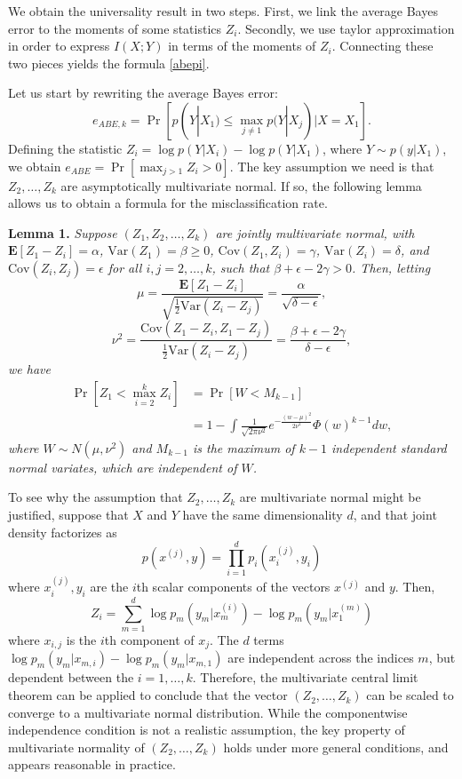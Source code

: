 \documentclass{article}
\newcommand{\E}{\textbf{E}}
\newcommand{\Cov}{\text{Cov}}
\newcommand{\Var}{\text{Var}}
\begin{document}
We obtain the universality result in two steps.  First, we link the
average Bayes error to the moments of some statistics $Z_i$.
Secondly, we use taylor approximation in order to express $I(X; Y)$ in
terms of the moments of $Z_i$.  Connecting these two pieces yields the
formula \eqref{abepi}.

Let us start by rewriting the average Bayes error:
\[
e_{ABE, k} = \Pr[p(Y|X_1) \leq \max_{j \neq 1} p(Y|X_j)| X = X_1].
\]
Defining the statistic $Z_i = \log p(Y|X_i) - \log p(Y|X_1)$, where $Y
\sim p(y|X_1)$, we obtain $ e_{ABE} = \Pr[\max_{j > 1} Z_i > 0].  $
The key assumption we need is that $Z_2,\hdots, Z_k$ are
asymptotically multivariate normal.  If so, the following lemma allows
us to obtain a formula for the misclassification rate.

\textbf{Lemma 1. }
\emph{
Suppose $(Z_1, Z_2, \hdots, Z_k)$ are jointly multivariate normal, with 
$\E[Z_1 - Z_i]= \alpha$, 
$\Var(Z_1) = \beta \geq 0$, 
$\Cov(Z_1, Z_i) = \gamma$, 
$\Var(Z_i)= \delta$, and $\Cov(Z_i, Z_j) = \epsilon$ for all $i, j = 2, \hdots,
k$, such that $\beta + \epsilon - 2\gamma > 0$.  Then, letting
\[
\mu = \frac{\E[Z_1 - Z_i]}{\sqrt{\frac{1}{2}\Var(Z_i - Z_j)}} = \frac{\alpha}{\sqrt{\delta - \epsilon}},
\]
\[
\nu^2 = \frac{\Cov(Z_1 -Z_i, Z_1 - Z_j)}{\frac{1}{2}\Var(Z_i - Z_j)} = \frac{\beta + \epsilon - 2\gamma}{\delta - \epsilon},
\]
we have
\begin{align*}
\Pr[Z_1 < \max_{i=2}^k Z_i] &= \Pr[W < M_{k-1}]
\\&= 1 - \int \frac{1}{\sqrt{2\pi\nu^2}} e^{-\frac{(w-\mu)^2}{2\nu^2}} \Phi(w)^{k-1} dw,
\end{align*}
where $W \sim N(\mu, \nu^2)$ and $M_{k-1}$ is the maximum of $k-1$
independent standard normal variates, which are independent of $W$.
}

To see why the assumption that $Z_2,\hdots, Z_k$ are multivariate normal might be justified, suppose that $X$ and $Y$ have the same dimensionality $d$, and that
joint density factorizes as
\[
p(x^{(j)}, y) = \prod_{i=1}^d p_i(x^{(j)}_i, y_i)
\]
where $x_i^{(j)}, y_i$ are the $i$th scalar components of the vectors $x^{(j)}$ and $y$.
Then,
\[
Z_i = \sum_{m=1}^d \log p_m(y_m | x^{(i)}_m) - \log p_m(y_m | x^{(m)}_1)
\]
where $x_{i, j}$ is the $i$th component of $x_j$.  The $d$ terms $\log
p_m(y_m | x_{m, i}) - \log p_m(y_m | x_{m, 1})$ are independent across
the indices $m$, but dependent between the $i = 1,\hdots, k$.
Therefore, the multivariate central limit theorem can be applied to
conclude that the vector $(Z_2,\hdots, Z_k)$ can be scaled to converge
to a multivariate normal distribution.  While the componentwise
independence condition is not a realistic assumption, the key property
of multivariate normality of $(Z_2,\hdots, Z_k)$ holds under more
general conditions, and appears reasonable in practice.
\end{document}

